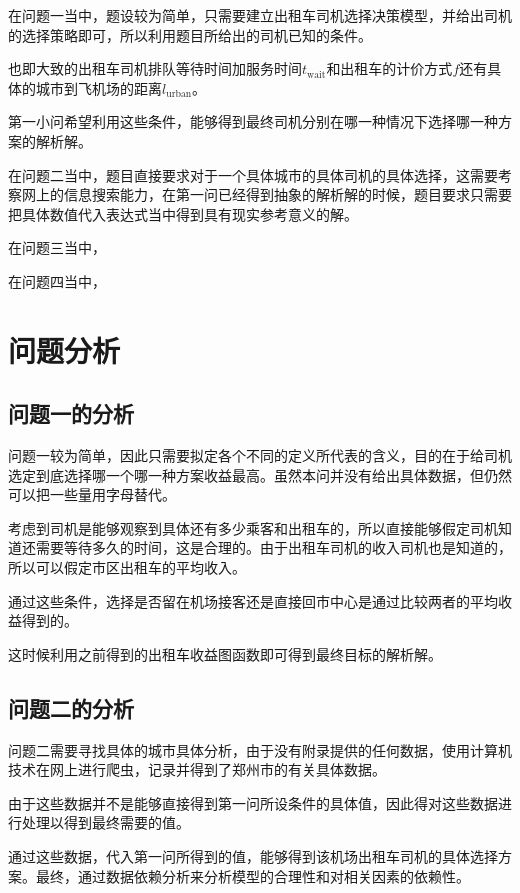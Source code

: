 \documentclass[withoutpreface,bwprint]{cumcmthesis} %
\begin{document}
\par
在问题一当中，题设较为简单，只需要建立出租车司机选择决策模型，并给出司机的选择策略即可，所以利用题目所给出的司机已知的条件。\par
也即大致的出租车司机排队等待时间加服务时间$t_{ \mathrm{wait}}$和出租车的计价方式$f$还有具体的城市到飞机场的距离$l_{\mathrm{urban}}$。\par
第一小问希望利用这些条件，能够得到最终司机分别在哪一种情况下选择哪一种方案的解析解。

\par
在问题二当中，题目直接要求对于一个具体城市的具体司机的具体选择，这需要考察网上的信息搜索能力，在第一问已经得到抽象的解析解的时候，题目要求只需要把具体数值代入表达式当中得到具有现实参考意义的解。

\par
在问题三当中，

\par
在问题四当中，

\newpage
\section{问题分析}
\subsection{问题一的分析}
问题一较为简单，因此只需要拟定各个不同的定义所代表的含义，目的在于给司机选定到底选择哪一个哪一种方案收益最高。虽然本问并没有给出具体数据，但仍然可以把一些量用字母替代。\par
考虑到司机是能够观察到具体还有多少乘客和出租车的，所以直接能够假定司机知道还需要等待多久的时间，这是合理的。由于出租车司机的收入司机也是知道的，所以可以假定市区出租车的平均收入。\par
通过这些条件，选择是否留在机场接客还是直接回市中心是通过比较两者的平均收益得到的。\par
这时候利用之前得到的出租车收益图函数即可得到最终目标的解析解。\par

\subsection{问题二的分析}
问题二需要寻找具体的城市具体分析，由于没有附录提供的任何数据，使用计算机技术在网上进行爬虫，记录并得到了郑州市的有关具体数据。\par
由于这些数据并不是能够直接得到第一问所设条件的具体值，因此得对这些数据进行处理以得到最终需要的值。\par
通过这些数据，代入第一问所得到的值，能够得到该机场出租车司机的具体选择方案。最终，通过数据依赖分析来分析模型的合理性和对相关因素的依赖性。\par
\end{document}
